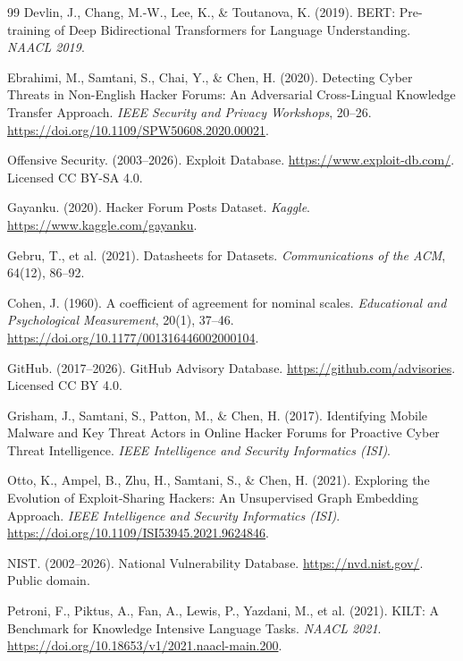 \documentclass{article}
\begin{document}
\begin{thebibliography}{99}
Devlin, J., Chang, M.-W., Lee, K., \& Toutanova, K.
(2019). BERT: Pre-training of Deep Bidirectional Transformers for
Language Understanding. \textit{NAACL 2019}.

Ebrahimi, M., Samtani, S., Chai, Y., \& Chen, H. (2020).
Detecting Cyber Threats in Non-English Hacker Forums: An Adversarial
Cross-Lingual Knowledge Transfer Approach.
\textit{IEEE Security and Privacy Workshops}, 20--26.
\url{https://doi.org/10.1109/SPW50608.2020.00021}.

Offensive Security. (2003--2026). Exploit Database.
\url{https://www.exploit-db.com/}. Licensed CC BY-SA 4.0.

Gayanku. (2020). Hacker Forum Posts Dataset.
\textit{Kaggle}. \url{https://www.kaggle.com/gayanku}.

Gebru, T., et al. (2021). Datasheets for Datasets.
\textit{Communications of the ACM}, 64(12), 86--92.

Cohen, J. (1960). A coefficient of agreement for nominal scales.
\textit{Educational and Psychological Measurement}, 20(1), 37--46.
\url{https://doi.org/10.1177/001316446002000104}.

GitHub. (2017--2026). GitHub Advisory Database.
\url{https://github.com/advisories}. Licensed CC BY 4.0.

Grisham, J., Samtani, S., Patton, M., \& Chen, H. (2017).
Identifying Mobile Malware and Key Threat Actors in Online Hacker Forums
for Proactive Cyber Threat Intelligence.
\textit{IEEE Intelligence and Security Informatics (ISI)}.

Otto, K., Ampel, B., Zhu, H., Samtani, S., \& Chen, H. (2021).
Exploring the Evolution of Exploit-Sharing Hackers: An Unsupervised
Graph Embedding Approach. \textit{IEEE Intelligence and Security
Informatics (ISI)}. \url{https://doi.org/10.1109/ISI53945.2021.9624846}.

NIST. (2002--2026). National Vulnerability Database.
\url{https://nvd.nist.gov/}. Public domain.

Petroni, F., Piktus, A., Fan, A., Lewis, P., Yazdani, M., et al.
(2021). KILT: A Benchmark for Knowledge Intensive Language Tasks.
\textit{NAACL 2021}. \url{https://doi.org/10.18653/v1/2021.naacl-main.200}.


\end{thebibliography}
\end{document}
